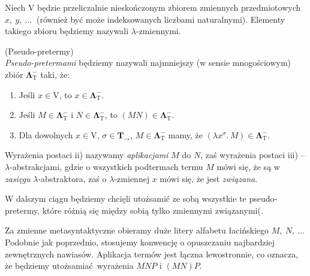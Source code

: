   Niech \(\mathrm{V}\) będzie przeliczalnie nieskończonym zbiorem zmiennych przedmiotowych \(x,\ y,\ \dots\ \) (również być może indeksowanych liczbami naturalnymi). Elementy takiego zbioru będziemy nazywali \(\lambda\)-zmiennymi.
 \begin{definicja}(Pseudo-pretermy)\\
  \emph{Pseudo-pretermami} będziemy nazywali najmniejszy (w sensie mnogościowym) zbiór \(\mathbf{\Lambda}^{-}_{\mathrm{T}}\) taki, że:
  \begin{enumerate}[label=\roman*)]
    \item Jeśli \(x\in \mathrm{V}\), to \(x\in\mathbf{\Lambda}^{-}_{\mathrm{T}}\).
    \item Jeśli \(M\in\mathbf{\Lambda}^{-}_{\mathrm{T}}\) i \(N\in\mathbf{\Lambda}^{-}_{\mathrm{T}}\), to \((MN)\in\mathbf{\Lambda}^{-}_{\mathrm{T}}\).
    \item Dla dowolnych \(x\in \mathrm{V}\), \(\sigma\in\mathbf{T}_\to\), \(M\in\mathbf{\Lambda}^{-}_{\mathrm{T}}\) mamy, że \((\lambda x^{\sigma}.\,M)\in \mathbf{\Lambda}^{-}_{\mathrm{T}}\).
  \end{enumerate}
 \end{definicja}
  Wyrażenia postaci ii) nazywamy \emph{aplikacjami} \(M\) do \(N\), zaś wyrażenia postaci iii) – \(\lambda\)-abstrakcjami, gdzie o wszystkich podtermach termu \(M\) mówi się, że są w \emph{zasięgu} \(\lambda\)-abstraktora, zaś o \(\lambda\)-zmiennej \(x\) mówi się, że jest \emph{związana}.

W dalszym ciągu będziemy chcięli utożsamić ze sobą wszystkie te pseudo-pretermy, które różnią się między sobią tylko zmiennymi związanymi(. 
  

  Za zmienne metasyntaktyczne obieramy duże litery alfabetu łacińskiego \(M,\ N,\ \dots\ \)Podobnie jak poprzednio, stosujemy konwencję o opuszczaniu najbardziej zewnętrznych nawiasów. Aplikacja termów jest łączna lewostronnie, co oznacza, że będziemy utożsamiać wyrażenia \(MNP\) i \((MN)P\).

